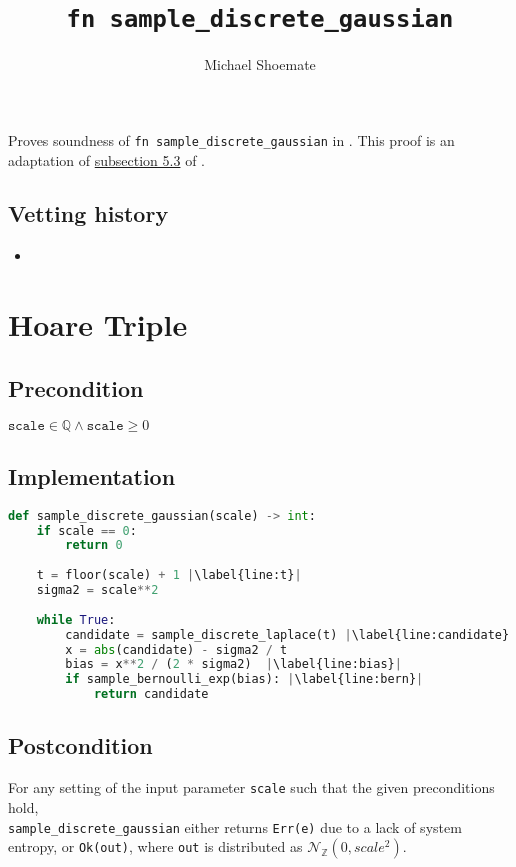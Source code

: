 \documentclass{article}
\title{\texttt{fn sample\_discrete\_gaussian}}
\author{Michael Shoemate}
\begin{document}
\maketitle

\contrib
Proves soundness of \texttt{fn sample\_discrete\_gaussian} in .
This proof is an adaptation of \href{https://arxiv.org/pdf/2004.00010.pdf#subsection.5.3}{subsection 5.3} of \cite{CKS20}.

\subsection*{Vetting history}
\begin{itemize}
    \item {}
\end{itemize}

\section{Hoare Triple}
\subsection*{Precondition}
$\texttt{scale} \in \mathbb{Q} \land \texttt{scale} \geq 0$

\subsection*{Implementation}        
\begin{lstlisting}[language=Python, escapechar=|]
def sample_discrete_gaussian(scale) -> int:
    if scale == 0:
        return 0
    
    t = floor(scale) + 1 |\label{line:t}|
    sigma2 = scale**2
    
    while True:
        candidate = sample_discrete_laplace(t) |\label{line:candidate}|
        x = abs(candidate) - sigma2 / t
        bias = x**2 / (2 * sigma2)  |\label{line:bias}|
        if sample_bernoulli_exp(bias): |\label{line:bern}|
            return candidate
\end{lstlisting}

\subsection*{Postcondition}
\label{postcondition}
For any setting of the input parameter \texttt{scale} such that the given preconditions hold, \\
\texttt{sample\_discrete\_gaussian} either returns \texttt{Err(e)} due to a lack of system entropy,
or \texttt{Ok(out)}, where \texttt{out} is distributed as $\mathcal{N}_\mathbb{Z}(0, scale^2)$.
\end{document}
